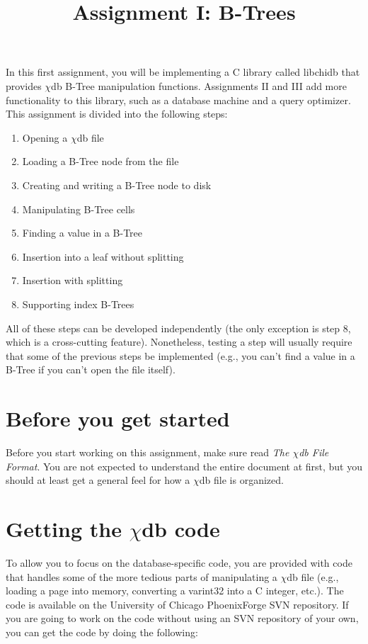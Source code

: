 \documentclass[10pt]{article}
\title{\chidb{} Assignment I: B-Trees}
\date{}
\newcommand{\chidb}{$\chi$\textsf{db}}
\begin{document}
\pagestyle{empty}
\maketitle

In this first assignment, you will be implementing a C library called \textsf{libchidb} that provides \chidb{} B-Tree manipulation functions. Assignments II and III add more functionality to this library, such as a database machine and a query optimizer. This assignment is divided into the following steps:

\begin{enumerate}
\item Opening a \chidb{} file
\item Loading a B-Tree node from the file
\item Creating and writing a B-Tree node to disk
\item Manipulating B-Tree cells
\item Finding a value in a B-Tree
\item Insertion into a leaf without splitting
\item Insertion with splitting
\item Supporting index B-Trees
\end{enumerate}

All of these steps can be developed independently (the only exception is step 8, which is a cross-cutting feature). Nonetheless, testing a step will usually require that some of the previous steps be implemented (e.g., you can't find a value in a B-Tree if you can't open the file itself).


\section*{Before you get started}

Before you start working on this assignment, make sure read \emph{The \chidb{} File Format}. You are not expected to understand the entire document at first, but you should at least get a general feel for how a \chidb{} file is organized.


\section*{Getting the \chidb{} code}

To allow you to focus on the database-specific code, you are provided with code that handles some of the more tedious parts of manipulating a \chidb{} file (e.g., loading a page into memory, converting a \textsf{varint32} into a C integer, etc.). The code is available on the University of Chicago PhoenixForge SVN repository. If you are going to work on the code without using an SVN repository of your own, you can get the code by doing the following:
\end{document}
